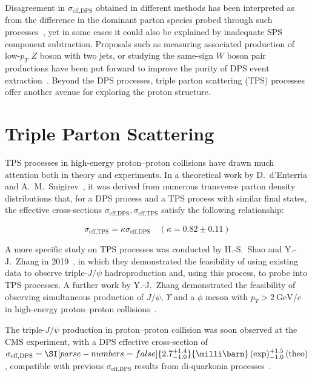 \begin{survey}
Disagreement in $\sigma_{\text{eff,DPS}}$ obtained in different methods has been interpreted as from the difference in the dominant parton species probed through such processes~\cite{Z48W3VLV}, yet in some cases it could also be explained by inadequate SPS component subtraction.
Proposals such as measuring associated production of low-$p_T$ $Z$ boson with two jets, or studying the same-sign $W$ boson pair productions have been put forward to improve the purity of DPS event extraction~\cite{andersenExploringHighPurityMultiparton2024,kuleszaLikesignBosonProduction2000}.
Beyond the DPS processes, triple parton scattering (TPS) processes offer another avenue for exploring the proton structure.

\section{Triple Parton Scattering}

TPS processes in high-energy proton--proton collisions have drawn much attention both in theory and experiments.
In a theoretical work by D.~d'Enterria and A.~M.~Snigirev~\cite{WHQAFHD5}, it was derived from numerous transverse parton density distributions that, for a DPS process and a TPS process with similar final states, the effective cross-sections $\sigma_{\text{eff,DPS}}, \sigma_{\text{eff,TPS}}$ satisfy the following relationship:

\begin{equation}
    \label{eq:appendix-survey-dps-tps-eff-xsec}
    \sigma_{\text{eff,TPS}} = \kappa \sigma_{\text{eff,DPS}} \quad (\kappa = 0.82 \pm  0.11)
\end{equation}

A more specific study on TPS processes was conducted by H.-S.\ Shao and Y.-J.\ Zhang in 2019~\cite{XREDRBCJ}, in which they demonstrated the feasibility of using existing data to observe triple-$J/\psi$ hadroproduction and, using this process, to probe into TPS processes.
A further work by Y.-J.\ Zhang demonstrated the feasibility of observing simultaneous production of $J/\psi$, $\Upsilon$ and a $\phi$ meson with $p_T > \SI{2}{\giga\eV}/c$ in high-energy proton--proton collisions~\cite{YJZ_MPS_REPORT}.

The triple-$J/\psi$ production in proton--proton collision was soon observed at the CMS experiment, with a DPS effective cross-section of $\sigma_{\text{eff,DPS}} = \SI[parse-numbers=false]{2.7^{+1.4}_{-1.0}}{\milli\barn}\,(\text{exp})^{+1.5}_{-1.0}\,(\text{theo})$, compatible with previous $\sigma_{\text{eff,DPS}}$ results from di-quarkonia processes~\cite{CMS_TRI_JPSI}.


\end{survey}
